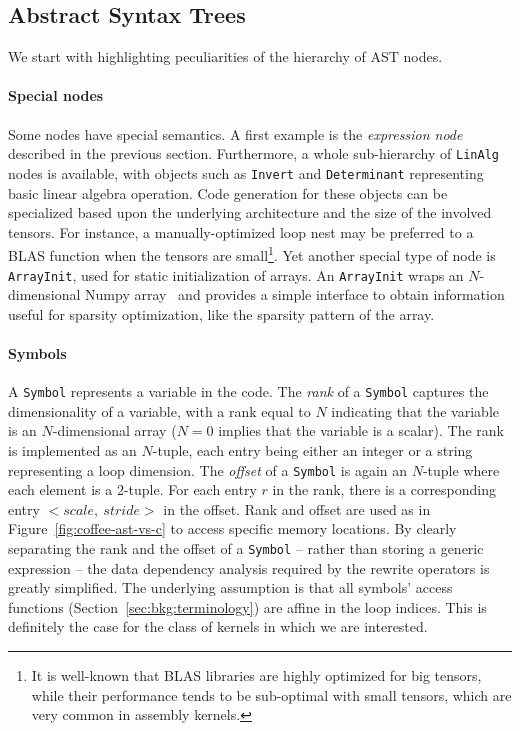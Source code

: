 \subsection{Abstract Syntax Trees}
We start with highlighting peculiarities of the hierarchy of AST nodes.

\paragraph{Special nodes}
Some nodes have special semantics. A first example is the {\it expression node} described in the previous section. Furthermore, a whole sub-hierarchy of \texttt{LinAlg} nodes is available, with objects such as \texttt{Invert} and \texttt{Determinant} representing basic linear algebra operation. Code generation for these objects can be specialized based upon the underlying architecture and the size of the involved tensors. For instance, a manually-optimized loop nest may be preferred to a BLAS function when the tensors are small\footnote{It is well-known that BLAS libraries are highly optimized for big tensors, while their performance tends to be sub-optimal with small tensors, which are very common in assembly kernels.}. Yet another special type of node is \texttt{ArrayInit}, used for static initialization of arrays. An \texttt{ArrayInit} wraps an $N$-dimensional Numpy array~\citep{Numpy} and provides a simple interface to obtain information useful for sparsity optimization, like the sparsity pattern of the array. 

\paragraph{Symbols}
A \texttt{Symbol} represents a variable in the code. The \textit{rank} of a \texttt{Symbol} captures the dimensionality of a variable, with a rank equal to $N$ indicating that the variable is an $N$-dimensional array ($N=0$ implies that the variable is a scalar). The rank is implemented as an $N$-tuple, each entry being either an integer or a string representing a loop dimension. The \textit{offset} of a \texttt{Symbol} is again an $N$-tuple where each element is a 2-tuple. For each entry $r$ in the rank, there is a corresponding entry ${<}scale,\ stride{>}$ in the offset. Rank and offset are used as in Figure~\ref{fig:coffee-ast-vs-c} to access specific memory locations. By clearly separating the rank and the offset of a \texttt{Symbol} -- rather than storing a generic expression -- the data dependency analysis required by the rewrite operators is greatly simplified. The underlying assumption is that all symbols' access functions (Section~\ref{sec:bkg:terminology}) are affine in the loop indices. This is definitely the case for the class of kernels in which we are interested.

